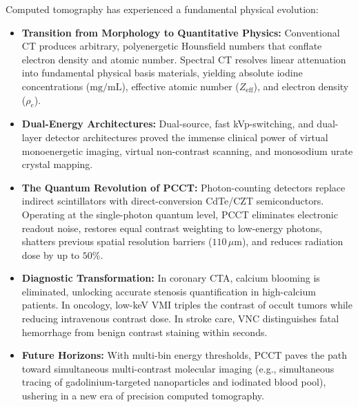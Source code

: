 \documentclass[11pt,a4paper]{article}
\begin{document}
Computed tomography has experienced a fundamental physical evolution:
\begin{itemize}[leftmargin=2em]
    \item \textbf{Transition from Morphology to Quantitative Physics:} Conventional CT produces arbitrary, polyenergetic Hounsfield numbers that conflate electron density and atomic number. Spectral CT resolves linear attenuation into fundamental physical basis materials, yielding absolute iodine concentrations ($\text{mg/mL}$), effective atomic number ($Z_{\text{eff}}$), and electron density ($\rho_e$).
    \item \textbf{Dual-Energy Architectures:} Dual-source, fast kVp-switching, and dual-layer detector architectures proved the immense clinical power of virtual monoenergetic imaging, virtual non-contrast scanning, and monosodium urate crystal mapping.
    \item \textbf{The Quantum Revolution of PCCT:} Photon-counting detectors replace indirect scintillators with direct-conversion CdTe/CZT semiconductors. Operating at the single-photon quantum level, PCCT eliminates electronic readout noise, restores equal contrast weighting to low-energy photons, shatters previous spatial resolution barriers ($110\,\mu\text{m}$), and reduces radiation dose by up to $50\%$.
    \item \textbf{Diagnostic Transformation:} In coronary CTA, calcium blooming is eliminated, unlocking accurate stenosis quantification in high-calcium patients. In oncology, low-keV VMI triples the contrast of occult tumors while reducing intravenous contrast dose. In stroke care, VNC distinguishes fatal hemorrhage from benign contrast staining within seconds.
    \item \textbf{Future Horizons:} With multi-bin energy thresholds, PCCT paves the path toward simultaneous multi-contrast molecular imaging (e.g., simultaneous tracing of gadolinium-targeted nanoparticles and iodinated blood pool), ushering in a new era of precision computed tomography.
\end{itemize}
\end{document}
